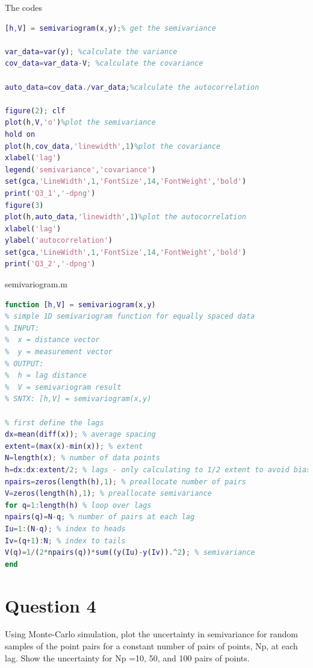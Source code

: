 \documentclass[
	12pt, %
]{fphw}
\begin{document}
The codes

\begin{lstlisting}[language=Matlab,escapeinside=``]
[h,V] = semivariogram(x,y);% get the semivariance

var_data=var(y); %calculate the variance
cov_data=var_data-V; %calculate the covariance

auto_data=cov_data./var_data;%calculate the autocorrelation

figure(2); clf
plot(h,V,'o')%plot the semivariance
hold on
plot(h,cov_data,'linewidth',1)%plot the covariance
xlabel('lag')
legend('semivariance','covariance')
set(gca,'LineWidth',1,'FontSize',14,'FontWeight','bold')
print('Q3_1','-dpng')
figure(3)
plot(h,auto_data,'linewidth',1)%plot the autocorrelation
xlabel('lag')
ylabel('autocorrelation')
set(gca,'LineWidth',1,'FontSize',14,'FontWeight','bold')
print('Q3_2','-dpng')
\end{lstlisting}

semivariogram.m

\begin{lstlisting}[language=Matlab,escapeinside=``]
function [h,V] = semivariogram(x,y)
% simple 1D semivariogram function for equally spaced data
% INPUT:  
%  x = distance vector
%  y = measurement vector
% OUTPUT:
%  h = lag distance
%  V = semivariogram result
% SNTX: [h,V] = semivariogram(x,y)

% first define the lags
dx=mean(diff(x)); % average spacing
extent=(max(x)-min(x)); % extent
N=length(x); % number of data points
h=dx:dx:extent/2; % lags - only calculating to 1/2 extent to avoid bias
npairs=zeros(length(h),1); % preallocate number of pairs
V=zeros(length(h),1); % preallocate semivariance
for q=1:length(h) % loop over lags
npairs(q)=N-q; % number of pairs at each lag
Iu=1:(N-q); % index to heads
Iv=(q+1):N; % index to tails
V(q)=1/(2*npairs(q))*sum((y(Iu)-y(Iv)).^2); % semivariance
end 
\end{lstlisting}
\clearpage
\section*{Question 4 }

\begin{problem}
Using Monte-Carlo simulation, plot the uncertainty in semivariance for random samples of
the point pairs for a constant number of pairs of points, Np, at each lag. Show the uncertainty
for Np =10, 50, and 100 pairs of points.
\end{problem}
\end{document}
